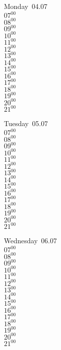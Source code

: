 \documentclass[11pt,a4paper]{book}\usepackage[]{graphicx}\usepackage[]{color}
\begin{document}
\begin{headerbox}
\end{headerbox}
\begin{weekdaybox}
  Monday~04.07\\
  { 
  \vfill
  $07^{00}$\\
$08^{00}$\\
$09^{00}$\\
$10^{00}$\\
$11^{00}$\\
$12^{00}$\\
$13^{00}$\\
$14^{00}$\\
$15^{00}$\\
$16^{00}$\\
$17^{00}$\\
$18^{00}$\\
$19^{00}$\\
$20^{00}$\\
$21^{00}$\\
  }
\end{weekdaybox}
\begin{weekdaybox}
  Tuesday~05.07\\
  { 
  \vfill
  $07^{00}$\\
$08^{00}$\\
$09^{00}$\\
$10^{00}$\\
$11^{00}$\\
$12^{00}$\\
$13^{00}$\\
$14^{00}$\\
$15^{00}$\\
$16^{00}$\\
$17^{00}$\\
$18^{00}$\\
$19^{00}$\\
$20^{00}$\\
$21^{00}$\\
  }
\end{weekdaybox}
\begin{weekdaybox}
  Wednesday~06.07\\
  { 
  \vfill
  $07^{00}$\\
$08^{00}$\\
$09^{00}$\\
$10^{00}$\\
$11^{00}$\\
$12^{00}$\\
$13^{00}$\\
$14^{00}$\\
$15^{00}$\\
$16^{00}$\\
$17^{00}$\\
$18^{00}$\\
$19^{00}$\\
$20^{00}$\\
$21^{00}$\\
  }
\end{weekdaybox}
\end{document}
